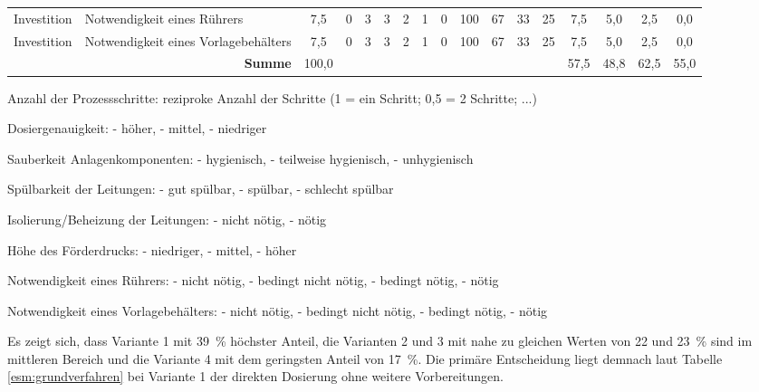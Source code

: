 \begin{table}
\begin{adjustbox}{max width=\textwidth}
\begin{threeparttable}
\begin{tabular}{l|l|c|c|c|cccc|cccc|cccc}
			Investition&Notwendigkeit eines Rührers			&7,5	&0&3	&3&2&1&0&100&67&33&25	&7,5&5,0&2,5&0,0\\
			Investition&Notwendigkeit eines Vorlagebehälters&7,5	&0&3	&3&2&1&0&100&67&33&25	&7,5&5,0&2,5&0,0\\
			\hline	
			\multicolumn{2}{r|}{\textbf{Summe}}	& 100,0 & \multicolumn{10}{c|}{ } & 57,5 &48,8&62,5&55,0\\
			\hline
	\end{tabular}
	\begin{tablenotes}[flushleft]
		\footnotesize
		\item Anzahl der Prozessschritte: \tab\tab reziproke Anzahl der Schritte  \tab (1 = ein Schritt; 0,5 = 2 Schritte; ...)
		\item Dosiergenauigkeit: \tab{} - höher,  - mittel,  - niedriger
		\item Sauberkeit Anlagenkomponenten:  - hygienisch,  - teilweise hygienisch,  - unhygienisch
		\item Spülbarkeit der Leitungen: \tab{} - gut spülbar,  - spülbar,  - schlecht spülbar
		\item Isolierung/Beheizung der Leitungen:  - nicht nötig,  - nötig
		\item Höhe des Förderdrucks: \tab{} - niedriger,  - mittel,  - höher
		\item Notwendigkeit eines Rührers: \tab{} - nicht nötig,  - bedingt nicht nötig,  - bedingt nötig,  - nötig
		\item Notwendigkeit eines Vorlagebehälters:  - nicht nötig,  - bedingt nicht nötig,  - bedingt nötig, - nötig
	\end{tablenotes}
\end{threeparttable}
\end{adjustbox}
\end{table}%
\FloatBarrier



Es zeigt sich, dass Variante 1 mit \SI{39}{\percent} höchster Anteil, die Varianten 2 und 3 mit nahe zu gleichen Werten von 22 und \SI{23}{\percent} sind im mittleren Bereich und die Variante 4 mit dem geringsten Anteil von \SI{17}{\percent}. Die primäre Entscheidung liegt demnach laut Tabelle \ref{esm:grundverfahren} bei Variante 1 der direkten Dosierung ohne weitere Vorbereitungen.



